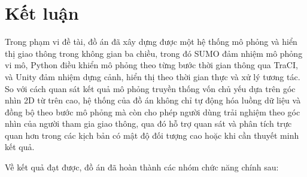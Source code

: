 \documentclass[../DoAn.tex]{subfiles}
\begin{document}
\section{Kết luận}

Trong phạm vi đề tài, đồ án đã xây dựng được một hệ thống mô phỏng và hiển thị
giao thông trong không gian ba chiều, trong đó \gls{SUMO} đảm nhiệm mô phỏng vi
mô, Python điều khiển mô phỏng theo từng bước thời gian thông qua \gls{TraCI}, và
Unity đảm nhiệm dựng cảnh, hiển thị theo thời gian thực và xử lý tương tác. So
với cách quan sát kết quả mô phỏng truyền thống vốn chủ yếu dựa trên góc nhìn 2D
từ trên cao, hệ thống của đồ án không chỉ tự động hóa luồng dữ liệu và đồng bộ
theo bước mô phỏng mà còn cho phép người dùng trải nghiệm theo góc nhìn của người
tham gia giao thông, qua đó hỗ trợ quan sát và phân tích trực quan hơn trong các
kịch bản có mật độ đối tượng cao hoặc khi cần thuyết minh kết quả.

Về kết quả đạt được, đồ án đã hoàn thành các nhóm chức năng chính sau:
\end{document}
